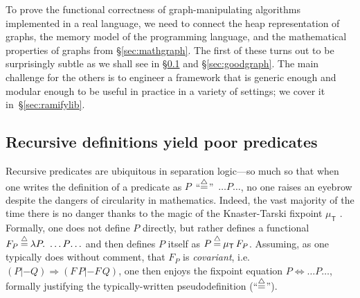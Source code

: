 

To prove the functional correctness of graph-manipulating algorithms implemented in a real language, we need to connect the heap representation of graphs, the memory model of the programming language, and the mathematical properties of graphs from \S\ref{sec:mathgraph}.  The first of these turns out to be surprisingly subtle as we shall see in \S\ref{sec:fixpointfail} and \S\ref{sec:goodgraph}.  The main challenge for the others is to engineer a framework that is generic enough and modular enough to be useful in practice in a variety of settings; we cover it in~\S\ref{sec:ramifylib}.



\subsection{Recursive definitions yield poor  predicates}\label{sec:fixpointfail}

\newcommand{\graphkt}{\p{graph}_T}
\newcommand{\grapham}{\p{graph}_A}


Recursive predicates are ubiquitous in separation logic---so
much so that when one writes the definition of a predicate as
\mbox{$P$ ``$\mathbin{\stackrel{\triangle}{=}}$'' $\ldots P \! \ldots$}, no one raises an eyebrow despite the
dangers of circularity in mathematics. Indeed, the vast majority of the time there
is no danger thanks to the magic of the Knaster-Tarski fixpoint
$\mu_{\mathsf{T}}$ \cite{tarski:fixpoint}.  Formally, one does not define $P$ directly,
but rather defines a functional
\mbox{$F_P \mathbin{\stackrel{\triangle}{=}} \lambda P.~ \ldots P \! \ldots$} and then defines $P$ itself as
\mbox{$P \mathbin{\stackrel{\triangle}{=}} \mu_{\mathsf{T}} \, F_P$}.
Assuming, as one typically does without comment,
that $F_P$ is \emph{covariant}, i.e. $(P |- Q)
\Rightarrow (F \, P |- F \, Q)$, one then enjoys the fixpoint
equation $P \Leftrightarrow \ldots P \ldots$, formally justifying
the typically-written pseudodefinition (``$\mathbin{\stackrel{\triangle}{=}}$'').


